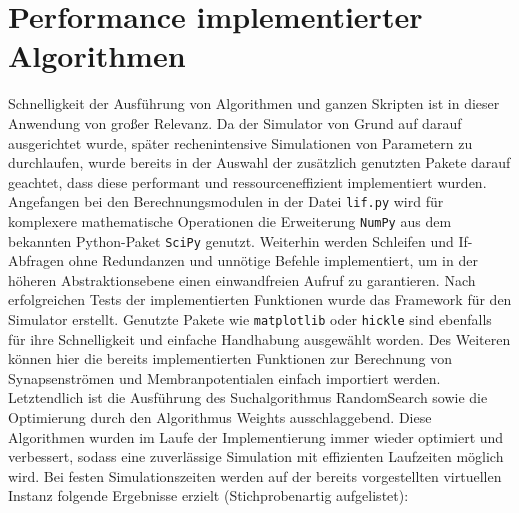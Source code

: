 \section{Performance implementierter Algorithmen}
\label{sec:erg_performance}
	Schnelligkeit der Ausführung von Algorithmen und ganzen Skripten ist in dieser Anwendung von großer Relevanz. Da der Simulator von Grund auf darauf ausgerichtet wurde, später rechenintensive Simulationen von Parametern zu durchlaufen, wurde bereits in der Auswahl der zusätzlich genutzten Pakete darauf geachtet, dass diese performant und ressourceneffizient implementiert wurden.\\
	Angefangen bei den Berechnungsmodulen in der Datei \texttt{lif.py} wird für komplexere mathematische Operationen die Erweiterung \texttt{NumPy} \cite{NumPy} aus dem bekannten Python-Paket \texttt{SciPy} \cite{NumPy} genutzt. Weiterhin werden Schleifen und If-Abfragen ohne Redundanzen und unnötige Befehle implementiert, um in der höheren Abstraktionsebene einen einwandfreien Aufruf zu garantieren. Nach erfolgreichen Tests der implementierten Funktionen wurde das Framework für den Simulator erstellt. Genutzte Pakete wie \texttt{matplotlib} \cite{Hunter2007} oder \texttt{hickle} \cite{hdf5} sind ebenfalls für ihre Schnelligkeit und einfache Handhabung ausgewählt worden. Des Weiteren können hier die bereits implementierten Funktionen zur Berechnung von Synapsenströmen und Membranpotentialen einfach importiert werden.\\
	Letztendlich ist die Ausführung des Suchalgorithmus RandomSearch sowie die Optimierung durch den Algorithmus Weights ausschlaggebend. Diese Algorithmen wurden im Laufe der Implementierung immer wieder optimiert und verbessert, sodass eine zuverlässige Simulation mit effizienten Laufzeiten möglich wird. Bei festen Simulationszeiten werden auf der bereits vorgestellten virtuellen Instanz folgende Ergebnisse erzielt (Stichprobenartig aufgelistet):
	\begin{table}[H]
		\centering
	\caption{Parametersuche durch Algorithmus \texttt{RandomSearch}.}
	\label{tab:sim_rs}
	\end{table}
